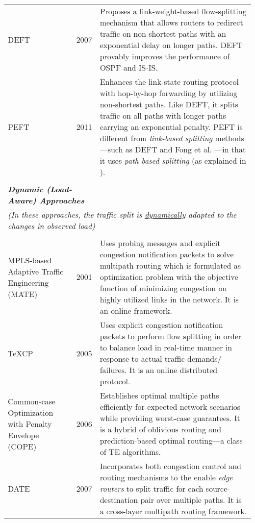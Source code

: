 \documentclass[10pt]{IEEEtran}
\begin{document}
\begin{table*}[!ht]
\begin{tabular}{p{2.7cm}p{1cm}p{13cm}}
DEFT \cite{xu2007deft} & 2007 & Proposes a link-weight-based flow-splitting mechanism that allows routers to redirect traffic on non-shortest paths with an exponential delay on longer paths. DEFT provably improves the performance of OSPF and IS-IS. \\

PEFT \cite{xu2011link} & 2011 & Enhances the link-state routing protocol with hop-by-hop forwarding by utilizing non-shortest paths. Like DEFT, it splits traffic on all paths with longer paths carrying an exponential penalty. PEFT is different from \textit{link-based splitting} methods---such as DEFT \cite{xu2007deft} and Fong et al. \cite{fong2005better}---in that it uses \textit{path-based splitting} (as explained in \cite{xu2011link}).\\

\\
\multicolumn{2}{l}{\textbf{\textit{Dynamic (Load-Aware) Approaches}}}\\
\multicolumn{3}{l}{\textit{(In these approaches, the traffic split is \underline{dynamically} adapted to the changes in observed load)}}\\
\\
MPLS-based Adaptive Traffic Engineering (MATE) \cite{elwalid2001mate} & 2001 & Uses probing messages and explicit congestion notification packets to solve multipath routing which is formulated as optimization problem with the objective function of minimizing congestion on highly utilized links in the network. It is an online framework.

\\

TeXCP \cite{kandula2005texcp} & 2005 & Uses explicit congestion notification packets to perform flow splitting in order to balance load in real-time manner in response to actual traffic demands/ failures. It is an online distributed protocol.

\\

Common-case Optimization with Penalty Envelope (COPE) \cite{wang2006cope} & 2006 & Establishes optimal multiple paths efficiently for expected network scenarios while providing worst-case guarantees. It is a hybrid of oblivious routing and prediction-based optimal routing---a class of TE algorithms. \\

DATE \cite{he2007towards} & 2007 & Incorporates both congestion control and routing mechanisms to the enable \textit{edge routers} to split traffic for each source-destination pair over multiple paths. It is a cross-layer multipath routing framework.


\end{tabular}
\end{table*}
\end{document}
